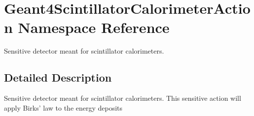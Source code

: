 \hypertarget{namespace_geant4_scintillator_calorimeter_action}{
\section{Geant4ScintillatorCalorimeterAction Namespace Reference}
\label{namespace_geant4_scintillator_calorimeter_action}
}


Sensitive detector meant for scintillator calorimeters.  


\subsection{Detailed Description}
Sensitive detector meant for scintillator calorimeters. This sensitive action will apply Birks' law to the energy deposits 